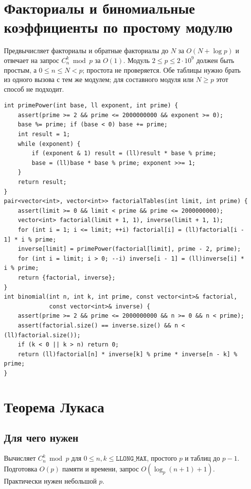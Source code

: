\section{Факториалы и биномиальные коэффициенты по простому модулю}
Предвычисляет факториалы и обратные факториалы до $N$ за $O(N+\log p)$ и отвечает на запрос $C_n^k\bmod p$ за $O(1)$.
Модуль $2\le p\le2\cdot10^9$ должен быть простым, а $0\le n\le N<p$; простота не проверяется.
Обе таблицы нужно брать из одного вызова с тем же модулем; для составного модуля или $N\ge p$ этот способ не подходит.
\begin{lstlisting}[name=extra_math_binomial]
int primePower(int base, ll exponent, int prime) {
    assert(prime >= 2 && prime <= 2000000000 && exponent >= 0);
    base %= prime; if (base < 0) base += prime;
    int result = 1;
    while (exponent) {
        if (exponent & 1) result = (ll)result * base % prime;
        base = (ll)base * base % prime; exponent >>= 1;
    }
    return result;
}
pair<vector<int>, vector<int>> factorialTables(int limit, int prime) {
    assert(limit >= 0 && limit < prime && prime <= 2000000000);
    vector<int> factorial(limit + 1, 1), inverse(limit + 1, 1);
    for (int i = 1; i <= limit; ++i) factorial[i] = (ll)factorial[i - 1] * i % prime;
    inverse[limit] = primePower(factorial[limit], prime - 2, prime);
    for (int i = limit; i > 0; --i) inverse[i - 1] = (ll)inverse[i] * i % prime;
    return {factorial, inverse};
}
int binomial(int n, int k, int prime, const vector<int>& factorial,
             const vector<int>& inverse) {
    assert(prime >= 2 && prime <= 2000000000 && n >= 0 && n < prime);
    assert(factorial.size() == inverse.size() && n < (ll)factorial.size());
    if (k < 0 || k > n) return 0;
    return (ll)factorial[n] * inverse[k] % prime * inverse[n - k] % prime;
}
\end{lstlisting}
%

\iffalse
\section{Теорема Лукаса}
\subsection*{Для чего нужен}
Вычисляет $C_n^k\bmod p$ для $0\le n,k\le\texttt{LLONG\_MAX}$,
простого $p$ и таблиц до $p-1$. Подготовка $O(p)$ памяти и времени,
запрос $O(\log_p(n+1)+1)$. Практически нужен небольшой $p$.
